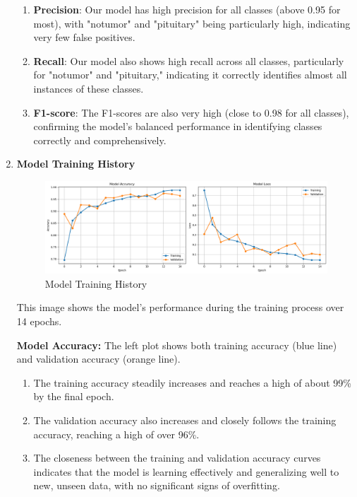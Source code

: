 \begin{enumerate}[label=\roman*.]
\begin{enumerate}
    \item \textbf{Precision}: Our model has high precision for all classes (above 0.95 for most), with "notumor" and "pituitary" being particularly high, indicating very few false positives.
    \item \textbf{Recall}: Our model also shows high recall across all classes, particularly for "notumor" and "pituitary," indicating it correctly identifies almost all instances of these classes.
    \item \textbf{F1-score}: The F1-scores are also very high (close to 0.98 for all classes), confirming the model's balanced performance in identifying classes correctly and comprehensively.
\end{enumerate}

\item \textbf{Model Training History}

\begin{figure}[H]
    \centering
    \includegraphics[width=1\linewidth]{Images/Metrices/traininghistory.png}
    \caption{Model Training History}
    \label{fig:Model Training History}
\end{figure}

This image shows the model's performance during the training process over 14 epochs.

\textbf{Model Accuracy:} The left plot shows both training accuracy (blue line) and validation accuracy (orange line). 
\begin{enumerate}[label=$\bullet$] 
    \item The training accuracy steadily increases and reaches a high of about 99\% by the final epoch.
    \item The validation accuracy also increases and closely follows the training accuracy, reaching a high of over 96\%.
    \item The closeness between the training and validation accuracy curves indicates that the model is learning effectively and generalizing well to new, unseen data, with no significant signs of overfitting.
\end{enumerate}


\end{enumerate}
